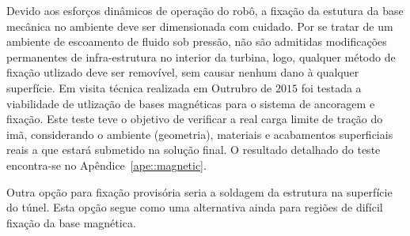 Devido aos esforços dinâmicos de operação do robô, a fixação da estutura da
base mecânica no ambiente deve ser dimensionada com cuidado. Por se
tratar de um ambiente de escoamento de fluido sob pressão, não são admitidas
modificações permanentes de infra-estrutura no interior da turbina, logo,
qualquer método de fixação utlizado deve ser removível, sem causar nenhum dano
à qualquer superfície. Em visita técnica realizada em Outrubro de $2015$ foi
testada a viabilidade de utlização de bases magnéticas para o sistema de
ancoragem e fixação. Este teste teve o objetivo de verificar a real carga limite de tração
do imã, considerando o ambiente (geometria), materiais e acabamentos
superficiais reais a que estará submetido na solução final. O resultado
detalhado do teste encontra-se no Apêndice~\ref{ape::magnetic}.

Outra opção para fixação provisória seria a soldagem da estrutura na
superfície do túnel. Esta opção segue como uma alternativa ainda para regiões
de difícil fixação da base magnética.